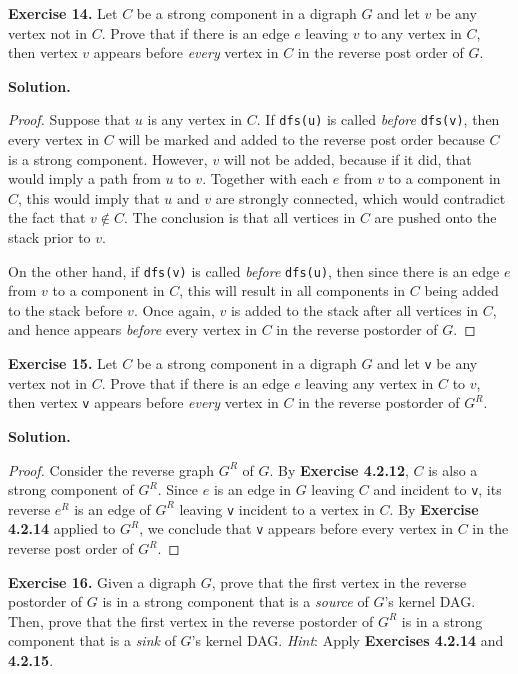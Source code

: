 \documentclass[12pt, a4paper]{article}
\newenvironment{ex}[2][Exercise]
{\par\medskip\noindent \textbf{#1 #2.}}
{\medskip}
\newenvironment{sol}[1][Solution]
{\par\medskip\noindent \textbf{#1.} }
{\medskip}
\begin{document}
	\begin{ex}{14}
		Let $C$ be a strong component in a digraph $G$ and let $v$ be any vertex not in $C$.
		Prove that if there is an edge $e$ leaving $v$ to any vertex in $C$, then
		vertex $v$ appears before \emph{every} vertex in $C$ in the reverse post order
		of $G$.
	\end{ex}
	\begin{sol}
		\begin{proof}
			Suppose that $u$ is any vertex in $C$. If \texttt{dfs(u)} is called \emph{before}
			\texttt{dfs(v)}, then every vertex in $C$ will be marked and added
			to the reverse post order because $C$ is a strong component. However,
			$v$ will not be added, because if it did, that would imply a path
			from $u$ to $v$. Together with each $e$ from $v$ to a component in $C$,
			this would imply that $u$ and $v$ are strongly connected, which would
			contradict the fact that $v\notin C$. The conclusion is that all
			vertices in $C$ are pushed onto the stack prior to $v$.
			
			On the other hand, if \texttt{dfs(v)} is called \emph{before} \texttt{dfs(u)},
			then since there is an edge $e$ from $v$ to a component in $C$, this will result
			in all components in $C$ being added to the stack before $v$. Once again,
			$v$ is added to the stack after all vertices in $C$, and hence appears
			\emph{before} every vertex in $C$ in the reverse postorder of $G$.
		\end{proof}
	\end{sol}
	\begin{ex}{15}
		Let $C$ be a strong component in a digraph $G$ and let \texttt{v} be any vertex not in $C$.
		Prove that if there is an edge $e$ leaving any vertex in $C$ to $v$, then vertex
		\texttt{v} appears before \emph{every} vertex in $C$ in the reverse postorder of $G^R$.
	\end{ex}
	\begin{sol}
		\begin{proof}
			Consider the reverse graph $G^R$ of $G$. By \textbf{Exercise 4.2.12}, $C$ is also a strong
			component of $G^R$. Since $e$ is an edge in $G$ leaving $C$ and incident to \texttt{v},
			its reverse $e^R$ is an edge of $G^R$ leaving \texttt{v} incident to a vertex
			in $C$. By \textbf{Exercise 4.2.14} applied to $G^R$, we conclude that \texttt{v} appears
			before every vertex in $C$ in the reverse post order of $G^R$.
		\end{proof}
	\end{sol}
	\begin{ex}{16}
		Given a digraph $G$, prove that the first vertex in the reverse postorder of $G$
		is in a strong component that is a \emph{source} of $G$'s kernel DAG. Then, prove
		that the first vertex in the reverse postorder of $G^R$ is in a strong component
		that is a \emph{sink} of $G$'s kernel DAG. \emph{Hint}: Apply \textbf{Exercises 4.2.14}
		and \textbf{4.2.15}.
	\end{ex}
\end{document}
